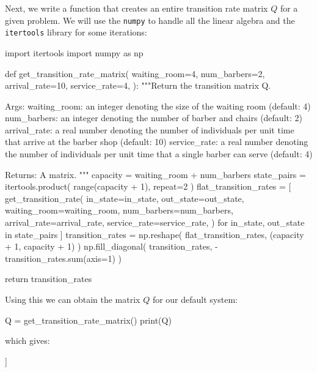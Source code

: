 Next, we write a function that creates an entire transition rate matrix \(Q\)
for a given problem. We will use the \texttt{numpy} to handle all
the linear algebra and the \texttt{itertools} library for some
iterations:

\begin{pyin}
import itertools
import numpy as np


def get_transition_rate_matrix(
    waiting_room=4,
    num_barbers=2,
    arrival_rate=10,
    service_rate=4,
):
    """Return the transition matrix Q.

    Args:
        waiting_room: an integer denoting the size of the
                      waiting room (default: 4)
        num_barbers: an integer denoting the number of
                           barber and chairs (default: 2)
        arrival_rate: a real number denoting the number of
                      individuals per unit time that arrive at
                      the barber shop (default: 10)
        service_rate: a real number denoting the number of
                      individuals per unit time that a single
                      barber can serve (default: 4)

    Returns:
        A matrix.
    """
    capacity = waiting_room + num_barbers
    state_pairs = itertools.product(
        range(capacity + 1), repeat=2
    )
    flat_transition_rates = [
        get_transition_rate(
            in_state=in_state,
            out_state=out_state,
            waiting_room=waiting_room,
            num_barbers=num_barbers,
            arrival_rate=arrival_rate,
            service_rate=service_rate,
        )
        for in_state, out_state in state_pairs
    ]
    transition_rates = np.reshape(
        flat_transition_rates, (capacity + 1, capacity + 1)
    )
    np.fill_diagonal(
        transition_rates, -transition_rates.sum(axis=1)
    )

    return transition_rates
\end{pyin}

Using this we can obtain the matrix \(Q\) for our default system:

\begin{pyin}
Q = get_transition_rate_matrix()
print(Q)
\end{pyin}

which gives:

\begin{pyout}
[[-10  10   0   0   0   0   0]
 [  4 -14  10   0   0   0   0]
 [  0   8 -18  10   0   0   0]
 [  0   0   8 -18  10   0   0]
 [  0   0   0   8 -18  10   0]
 [  0   0   0   0   8 -18  10]
 [  0   0   0   0   0   8  -8]]
\end{pyout}


